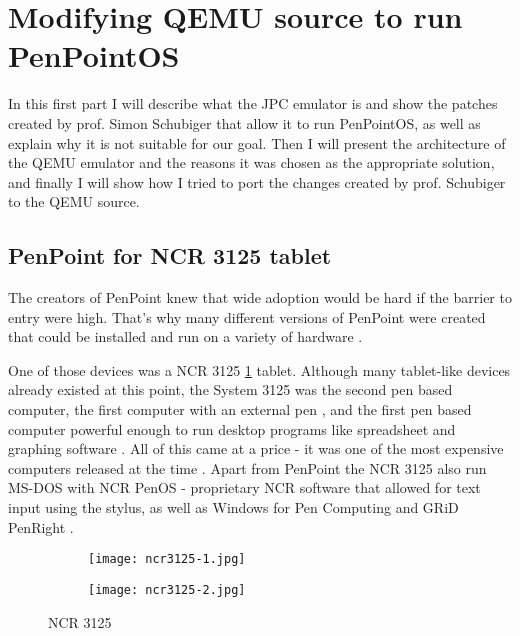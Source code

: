\clearpage %

\section{Modifying QEMU source to run PenPointOS}

In this first part I will describe what the JPC emulator is and show the
patches created by prof. Simon Schubiger that allow it to run PenPointOS, as
well as explain why it is not suitable for our goal. Then I will present the
architecture of the QEMU emulator and the reasons it was chosen as the
appropriate solution, and finally I will show how I tried to port the changes
created by prof. Schubiger to the QEMU source.

\subsection{PenPoint for NCR 3125 tablet}

The creators of PenPoint knew that wide adoption would be hard if the barrier
to entry were high. That's why many different versions of PenPoint were created
that could be installed and run on a variety of hardware \cite{carr1991}.

One of those devices was a NCR 3125 \ref{fig:ncr3125} tablet. Although many
tablet-like devices already existed at this point, the System 3125 was the
second pen based computer, the first computer with an external pen
\cite{hohl2014}, and the first pen based computer powerful enough to run
desktop programs like spreadsheet and graphing software \cite{mcdonald2011}.
All of this came at a price - it was one of the most expensive computers
released at the time \cite{hohl2014}. Apart from PenPoint the NCR 3125 also run
MS-DOS with NCR PenOS - proprietary NCR software that allowed for text input
using the stylus, as well as Windows for Pen Computing and GRiD PenRight
\cite{stengel}.

\begin{figure}[!h]
    \centering
    \begin{subfigure}[b]{0.55\linewidth}
        \texttt{[image: ncr3125-1.jpg]}
    \end{subfigure}
    \hfill
    \begin{subfigure}[b]{0.35\linewidth}
        \texttt{[image: ncr3125-2.jpg]}
    \end{subfigure}
    \caption{NCR 3125}
    \label{fig:ncr3125}
\end{figure}

